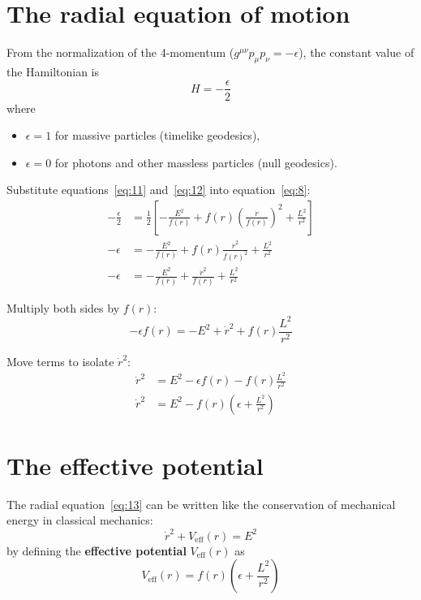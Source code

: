 \documentclass[11pt,a4paper]{article}
\newcommand{\Veff}{V_{\text{eff}}}
\begin{document}
\section{The radial equation of motion}

From the normalization of the 4-momentum ($g^{\mu\nu} p_\mu p_\nu = -\epsilon$), the constant value of the Hamiltonian is
\begin{equation*}
H = -\frac{\epsilon}{2} \tag{12}\label{eq:12}
\end{equation*}
where
\begin{itemize}
  \item $\epsilon = 1$ for massive particles (timelike geodesics),
  \item $\epsilon = 0$ for photons and other massless particles (null geodesics).
\end{itemize}

Substitute equations~\eqref{eq:11} and~\eqref{eq:12} into equation~\eqref{eq:8}:
\begin{align*}
    -\frac{\epsilon}{2} &= \frac{1}{2} \left[ -\frac{E^2}{f(r)} + f(r) \left( \frac{\dot{r}}{f(r)} \right)^2 + \frac{L^2}{r^2} \right] \\
    -\epsilon &= -\frac{E^2}{f(r)} + f(r) \frac{\dot{r}^2}{f(r)^2} + \frac{L^2}{r^2} \\
    -\epsilon &= -\frac{E^2}{f(r)} + \frac{\dot{r}^2}{f(r)} + \frac{L^2}{r^2}
\end{align*}

Multiply both sides by $f(r)$:
\begin{equation*}
-\epsilon f(r) = -E^2 + \dot{r}^2 + f(r) \frac{L^2}{r^2}
\end{equation*}

Move terms to isolate $\dot{r}^2$:
\begin{align*}
    \dot{r}^2 &= E^2 - \epsilon f(r) - f(r) \frac{L^2}{r^2} \\
    \dot{r}^2 &= E^2 - f(r) \left( \epsilon + \frac{L^2}{r^2} \right) \tag{13}\label{eq:13}
\end{align*}

\section{The effective potential}

The radial equation~\eqref{eq:13} can be written like the conservation of mechanical energy in classical mechanics:
\begin{equation*}
\dot{r}^2 + \Veff(r) = E^2 \tag{14}\label{eq:14}
\end{equation*}
by defining the \textbf{effective potential} $\Veff(r)$ as
\begin{equation*}
\Veff(r) = f(r) \left( \epsilon + \frac{L^2}{r^2} \right) \tag{15}\label{eq:15}
\end{equation*}
\end{document}
